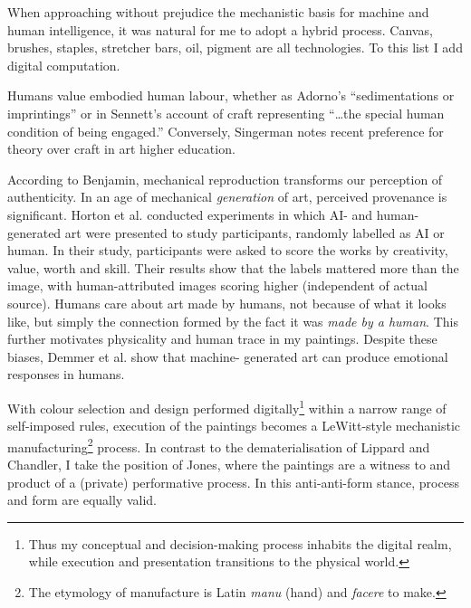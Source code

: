 \documentclass[12pt]{article}
\begin{document}
When approaching without prejudice the mechanistic basis for machine
and human intelligence, it was natural for me to adopt a hybrid
process. Canvas, brushes, staples, stretcher bars, oil, pigment are
all technologies. To this list I add digital computation.

Humans value embodied human labour, whether as Adorno's
``sedimentations or imprintings''\autocite[p.~5]{adorno1970aesthetic} or
in Sennett's account of craft representing ``\dots the special human
condition of being engaged.''\autocite[p.~20]{sennett2008craftsman}
Conversely, Singerman notes recent preference for theory over craft
in art higher education.\autocite[pp.~23--27]{singerman1999artist}

According to Benjamin, mechanical reproduction transforms our
perception of authenticity.\autocite{benjamin1969art} In an age of
mechanical \emph{generation} of art, perceived provenance is
significant. Horton et al. conducted experiments in which AI- and human-
generated art were presented to study participants, randomly labelled
as AI or human.\autocite{horton2023bias} In their study, participants were
asked to score the works by creativity, value, worth and skill. Their
results show that the labels mattered more than the image, with
human-attributed images scoring higher (independent of actual source).
Humans care about art made by humans, not because of what it looks
like, but simply the connection formed by the fact it was \emph{made
  by a human}. This further motivates physicality and human trace in
my paintings. Despite these biases, Demmer et al. show that machine-
generated art can produce emotional responses in
humans.\autocite{demmer2023does}

With colour selection and design performed digitally\footnote{Thus my
  conceptual and decision-making process inhabits the digital realm,
  while execution and presentation transitions to the physical world.}
within a narrow range of self-imposed rules, execution of the
paintings becomes a LeWitt-style\autocite[Sentence
\#28]{LeWitt1969Sentences} mechanistic manufacturing\footnote{The
  etymology of manufacture is Latin \emph{manu} (hand) and
  \emph{facere} to make.} process. In contrast to the
dematerialisation of Lippard and
Chandler,\autocite{LippardChandler1968Dematerialization,lippard1973sixyears}
I take the position of Jones,\autocite[pp.~12--13]{Jones1998BodyArt} where
the paintings are a witness to and product of a (private) performative
process. In this anti-anti-form\autocite{Morris1968AntiForm} stance,
process and form are equally valid.
\end{document}
